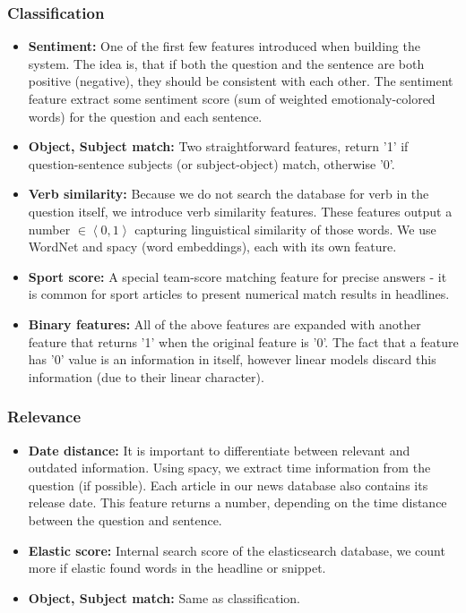 \documentclass[11pt,a4paper]{article}
\begin{document}
\subsubsection{Classification}
\begin{itemize}
\item \textbf{Sentiment:} One of the first few features introduced when building the system. The idea is, that if both the question and the sentence are both positive (negative), they should be consistent with each other. The sentiment feature extract some sentiment score (sum of weighted emotionaly-colored words) for the question and each sentence.

\item\textbf{Object, Subject match:} Two straightforward features, return '1' if question-sentence subjects (or subject-object) match, otherwise '0'.

\item\textbf{Verb similarity:} Because we do not search the database for verb in the question itself, we introduce verb similarity features. These features output a number $\in \left\langle 0,1\right\rangle$ capturing linguistical similarity of those words. We use WordNet and spacy (word embeddings), each with its own feature.

\item\textbf{Sport score:} A special team-score matching feature for precise answers - it is common for sport articles to present numerical match results in headlines.

\item\textbf{Binary features:} All of the above features are expanded with another feature that returns '1' when the original feature is '0'. The fact that a feature has '0' value is an information in itself, however linear models discard this information (due to their linear character).

\end{itemize}

\subsubsection{Relevance}
\begin{itemize}
\item \textbf{Date distance:} It is important to differentiate between relevant and outdated information. Using spacy, we extract time information from the question (if possible). Each article in our news database also contains its release date. This feature returns a number, depending on the time distance between the question and sentence.

\item\textbf{Elastic score:} Internal search score of the elasticsearch database, we count more if elastic found words in the headline or snippet.

\item\textbf{Object, Subject match:} Same as classification.


\end{itemize}
\end{document}
